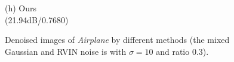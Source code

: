 \documentclass[runningheads]{llncs}
\begin{document}
\begin{figure}
{\begin{minipage}[t]{0.244\textwidth}
{\footnotesize (h) Ours \\(21.94dB/0.7680)}
\end{minipage}
}
\caption{Denoised images of \textsl{Airplane} by different methods (the mixed Gaussian and RVIN noise is with $\sigma = 10$ and ratio $0.3$).}
\label{fig11}
\end{figure}

\begin{figure}
\centering
{}
\end{figure}
\end{document}
